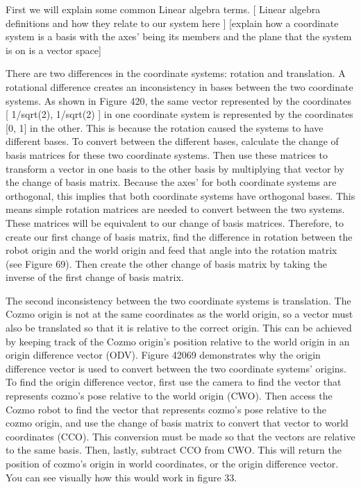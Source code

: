 \documentclass[jou,apacite]{apa6}
\begin{document}
First we will explain some common Linear algebra terms. 
[ Linear algebra definitions and how they relate to our system here ]
[explain how a coordinate system is a basis with the axes’ being its members and the plane that the system is on is a vector space]

There are two differences in the coordinate systems: rotation and translation. A rotational difference creates an inconsistency in bases between the two coordinate systems. As shown in Figure 420, the same vector represented by the coordinates [ 1/sqrt(2), 1/sqrt(2) ] in one coordinate system is represented by the coordinates [0, 1] in the other. This is because the rotation caused the systems to have different bases. To convert between the different bases, calculate the change of basis matrices for these two coordinate systems. Then use these matrices to transform a vector in one basis to the other basis by multiplying that vector by the change of basis matrix. Because the axes’ for both coordinate systems are orthogonal, this implies that both coordinate systems have orthogonal bases. This means simple rotation matrices are needed to convert between the two systems. These matrices will be equivalent to our change of basis matrices. Therefore, to create our first change of basis matrix, find the difference in rotation between the robot origin and the world origin and feed that angle into the rotation matrix (see Figure 69). Then create the other change of basis matrix by taking the inverse of the first change of basis matrix.

The second inconsistency between the two coordinate systems is translation. The Cozmo origin is not at the same coordinates as the world origin, so a vector must also be translated so that it is relative to the correct origin. This can be achieved by keeping track of the Cozmo origin’s position relative to the world origin in an origin difference vector (ODV). Figure 42069 demonstrates why the origin difference vector is used to convert between the two coordinate systems’ origins. To find the origin difference vector, first use the camera to find the vector that represents cozmo’s pose relative to the world origin (CWO). Then access the Cozmo robot to find the vector that represents cozmo’s pose relative to the cozmo origin, and use the change of basis matrix to convert that vector to world coordinates (CCO). This conversion must be made so that the vectors are relative to the same basis. Then, lastly, subtract CCO from CWO. This will return the position of cozmo’s origin in world coordinates, or the origin difference vector. You can see visually how this would work in figure 33.
\end{document}

